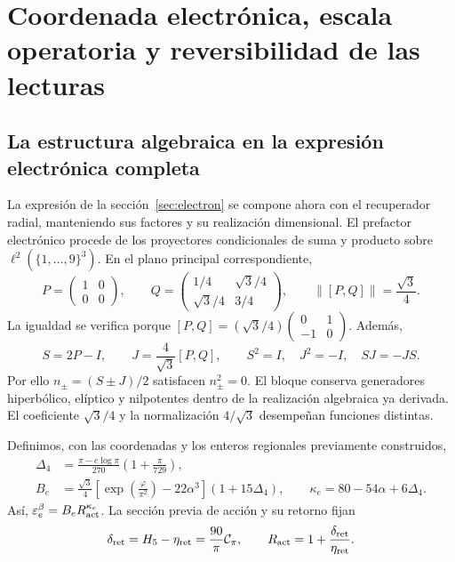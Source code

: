 \section{Coordenada electrónica, escala operatoria y reversibilidad de las lecturas}
\label{rec:recuperacion}

\subsection{La estructura algebraica en la expresión electrónica completa}

La expresión de la sección~\ref{sec:electron} se compone ahora con el recuperador radial, manteniendo sus factores y su realización dimensional. El prefactor electrónico procede de los proyectores condicionales de suma y producto sobre \(\ell^2(\{1,\ldots,9\}^3)\). En el plano principal correspondiente,
\[
 P=\begin{pmatrix}1&0\\0&0\end{pmatrix},\qquad
 Q=\begin{pmatrix}1/4&\sqrt3/4\\\sqrt3/4&3/4\end{pmatrix},
 \qquad\|[P,Q]\|=\frac{\sqrt3}{4}.
\]
La igualdad se verifica porque
\([P,Q]=(\sqrt3/4)\left(\begin{smallmatrix}0&1\\-1&0\end{smallmatrix}\right)\).
Además,
\[
 S=2P-I,\qquad J=\frac4{\sqrt3}[P,Q],\qquad
 S^2=I,\quad J^2=-I,\quad SJ=-JS.
\]
Por ello \(n_\pm=(S\pm J)/2\) satisfacen \(n_\pm^2=0\). El bloque conserva generadores hiperbólico, elíptico y nilpotentes dentro de la realización algebraica ya derivada. El coeficiente \(\sqrt3/4\) y la normalización \(4/\sqrt3\) desempeñan funciones distintas.

Definimos, con las coordenadas y los enteros regionales previamente construidos,
\begin{align}
 \Delta_4&=\frac{\pi-e\log\pi}{270}\left(1+\frac\pi{729}\right),\nonumber\\
 B_e&=\frac{\sqrt3}{4}
       \left[\exp\!\left(\frac\varphi{\pi^2}\right)-22\alpha^3\right]
       (1+15\Delta_4),\qquad
 \kappa_e=80-54\alpha+6\Delta_4.
 \label{rec:eq:electron-basal}
\end{align}
Así, \(\varepsilon_e^{\beta}=B_eR_{\rm act}^{\kappa_e}\). La sección previa de acción y su retorno fijan
\[
 \delta_{\rm ret}=H_5-\eta_{\rm ret}=\frac{90}{\pi}\mathcal C_\pi,
 \qquad R_{\rm act}=1+\frac{\delta_{\rm ret}}{\eta_{\rm ret}}.
\]


